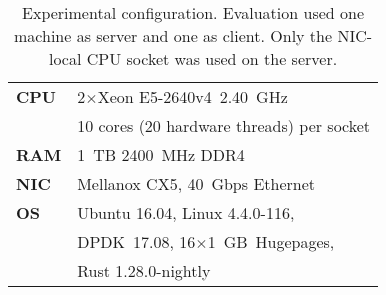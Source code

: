 \begin{table}[t]
\caption{Experimental configuration. Evaluation used
one machine as server and one as client.
Only the NIC-local CPU socket was used on the server.}
\centering
\begin{tabular}{p{} p{}}
\toprule
\textbf{CPU} & 2$\times$Xeon E5-2640v4~2.40~GHz\\
  & 10 cores (20 hardware threads) per socket
\\
\midrule
\textbf{RAM} & 1~TB 2400~MHz DDR4
\\
\midrule
\textbf{NIC} & Mellanox CX5, 40~Gbps Ethernet
\\
\midrule
\textbf{OS} & Ubuntu 16.04, Linux 4.4.0-116,\\
        & DPDK~17.08, 16$\times$1~GB~Hugepages,\\
        & Rust 1.28.0-nightly
\\
\bottomrule
\end{tabular}
\label{table:setup}
\end{table}
